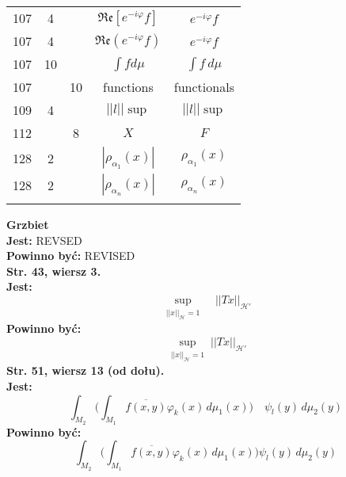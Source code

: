 \documentclass[a4paper,11pt]{article}
\newcommand{\ol}{\overline}
\newcommand{\mc}{\mathcal}
\newcommand{\mf}{\mathfrak}
\newcommand{\al}{\alpha}
\newcommand{\vp}{\varphi}
\newcommand{\Hc}{\mc{H}}
\newcommand{\Real}{\mf{Re}}
\newcommand{\Int}{\int\limits}
\newcommand{\IntCaD}[2] { \Int #1 \, d#2 } %
\newcommand{\norm}[1]{\left|\left| #1 \right|\right|}
\newcommand{\tb}{\textbf}
\newcommand{\noi}{\noindent}
\newcommand{\StrWg}[2]{\tb{Str. #1, wiersz #2.}}
\newcommand{\StrWd}[2]{\tb{Str. #1, wiersz #2 (od dołu).}}
\newcommand{\Jest}{\tb{Jest: }}
\newcommand{\Pow}{\tb{Powinno być: }}
\begin{document}
\begin{center}
\begin{tabular}{|c|c|c|c|c|}
    107 & 4 & & $\Real[ e^{ -i \vp } f ]$ & $e^{ -i \vp } f$ \\
    107 & 4 & & $\Real( e^{ -i \vp } f )$ & $e^{ -i \vp } f$ \\
    107 & 10 & & $\int\! fd\mu$ & $\IntCaD{ f }{ \mu }$ \\
    107 & & 10 & functions & functionals \\
    109 & 4 & & $\norm{ l }\!\sup$ & $\norm{ l } \sup$ \\
    112 & & 8 & $X$ & $F$ \\
    128 & 2 & & $| \rho_{ \al_{ 1 } }( x ) |$ & $\rho_{ \al_{ 1 } }( x )$ \\
    128 & 2 & & $| \rho_{ \al_{ n } }( x ) |$ & $\rho_{ \al_{ n } }( x )$ \\
    & & & & \\ \hline
  \end{tabular}
\end{center}
\noi
\tb{Grzbiet} \\
\Jest REVSED \\
\Pow REVISED \\
\StrWg{43}{3} \\
\Jest
\begin{equation*}
  \sup_{ \substack{ \norm{ x }_{ \Hc } = 1 } } \;\;\; \norm{ T x }_{ \Hc' }
\end{equation*}
\Pow
\begin{equation*}
  \sup_{ \substack{ \norm{ x }_{ \Hc } = 1 } } \norm{ T x }_{ \Hc' }
\end{equation*}
\StrWd{51}{13} \\
\Jest
\begin{equation*}
  \int_{ M_{ 2 } } \bigg( \int_{ M_{ 1 } } \ol{ f( x, y ) } \vp_{ k }( x ) \,
  d\mu_{ 1 }( x ) \bigg) \quad \psi_{ l }( y ) \, d\mu_{ 2 }( y )
\end{equation*}
\Pow
\begin{equation*}
  \int_{ M_{ 2 } } \bigg( \int_{ M_{ 1 } } \ol{ f( x, y ) } \vp_{ k }( x ) \,
  d\mu_{ 1 }( x ) \bigg) \psi_{ l }( y ) \, d\mu_{ 2 }( y )
\end{equation*}



 {}
\end{document}
